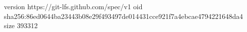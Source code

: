 version https://git-lfs.github.com/spec/v1
oid sha256:86ed0644ba23443b08e29f493497de014431cce921f7a4ebcae4794221648da4
size 393312
